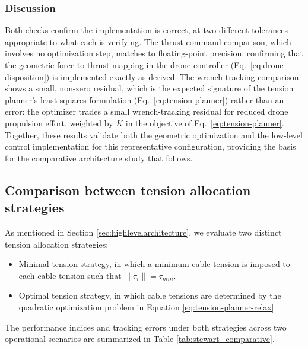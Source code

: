 \subsubsection{Discussion}
Both checks confirm the implementation is correct, at two different tolerances appropriate to what
each is verifying. The thrust-command comparison, which involves no optimization step, matches to
floating-point precision, confirming that the geometric force-to-thrust mapping in the drone
controller (Eq.~\ref{eq:drone-disposition}) is implemented exactly as derived. The wrench-tracking
comparison shows a small, non-zero residual, which is the expected signature of the tension
planner's least-squares formulation (Eq.~\ref{eq:tension-planner}) rather than an error: the
optimizer trades a small wrench-tracking residual for reduced drone propulsion effort, weighted by
$K$ in the objective of Eq.~\ref{eq:tension-planner}. Together, these results validate both the
geometric optimization and the low-level control implementation for this representative
configuration, providing the basis for the comparative architecture study that follows.

\subsection{Comparison between tension allocation strategies}
As mentioned in Section \ref{sec:highlevelarchitecture}, we evaluate two distinct tension allocation strategies:
\begin{itemize}
    \item Minimal tension strategy, in which a minimum cable tension is imposed to each cable tension such that $\|\tau_i \| = \tau_{min}$.
    \item Optimal tension strategy, in which cable tensions are determined by the quadratic optimization problem in Equation \ref{eq:tension-planner-relax}
\end{itemize}

The performance indices and tracking errors under both strategies across two operational scenarios are summarized in Table \ref{tab:stewart_comparative}.

